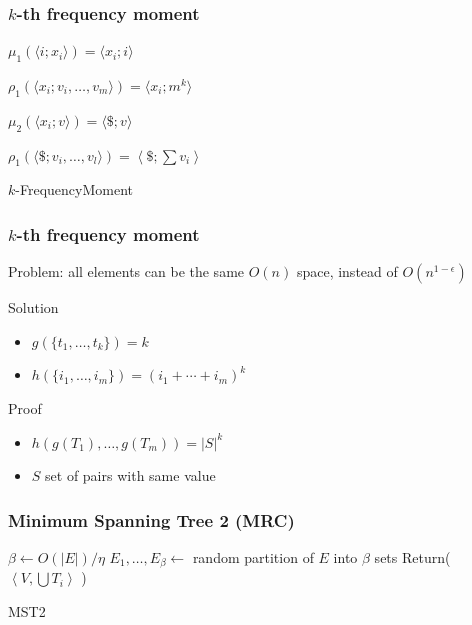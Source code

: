 \documentclass[12pt,aspectratio=169]{beamer}
\begin{document}
\begin{frame}\frametitle{$k$-th frequency moment}
\begin{algorithm}[H]

$\mu_{1}(\langle i; x_{i} \rangle) = \langle x_{i}; i \rangle$\;

$\rho_{1}  (\langle x_{i} ; {v_{i} , \ldots , v_{m}} \rangle) = \langle x_{i} ;
m^{k}\rangle$\;

$\mu_{2}(\langle x_{i} ; v \rangle) = \langle \$ ; v \rangle$\;

$\rho_{1}  (\langle \$ ; {v_{i} , \ldots , v_{l}} \rangle) = \left\langle \$
; \sum v_{i} \right\rangle $\;
\caption{$k$-FrequencyMoment}
\end{algorithm}
\end{frame}


\begin{frame}\frametitle{$k$-th frequency moment}
  \begin{block}{Problem: all elements can be the same}
      $O(n)$ space, instead of $O(n^{1-\epsilon})$
    \end{block}

  \begin{block}{Solution}
    \begin{itemize}
    \item
      $g(\{t_{1}, \ldots , t_{k} \}) = k$
    \item
      $h(\{i_{1}, \ldots , i_{m} \}) = (i_{1} + \cdots + i_{m} )^{k}$
    \end{itemize}
  \end{block}

  \begin{block}{Proof}
    \begin{itemize}
    \item
      $h(g(T_{1}), \ldots , g(T_{m})) = |S|^{k}$
    \item
      $S$ set of pairs with same value
    \end{itemize}
  \end{block}
\end{frame}


\begin{frame}\frametitle{Minimum Spanning Tree 2 (MRC)}
  \begin{algorithm}[H]

    $\beta\gets O(|E|)/\eta$\; 
    $E_{1}, \ldots, E_{\beta} \gets $ random partition of $E$ into $\beta$ sets\;
    Return($\left\langle V, \bigcup T_{i} \right\rangle$ )
    \label{alg:MRC-MST2}
    \caption{MST2}
  \end{algorithm}
\end{frame}
\end{document}
